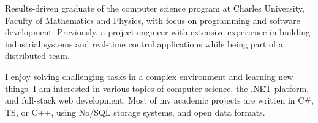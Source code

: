 Results-driven graduate of the computer science program at Charles University, Faculty of Mathematics and Physics, with focus on programming and software development. Previously, a project engineer with extensive experience in building industrial systems and real-time control applications while being part of a distributed team.

I enjoy solving challenging tasks in a complex environment and learning new things. I am interested in various topics of computer science, the .NET platform, and full-stack web development. Most of my academic projects are written in C\#, TS, or C++, using No/SQL storage systems, and open data formats.
